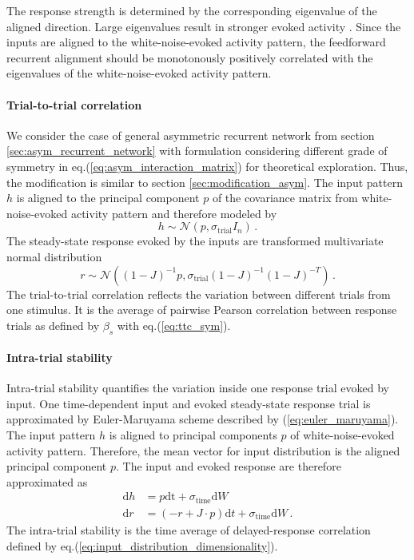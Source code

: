 \documentclass[11pt]{article}
\begin{document}
{	The response strength is determined by the corresponding eigenvalue of the aligned direction. Large eigenvalues result in stronger evoked activity \cite{dayan2005theoretical}. Since the inputs are aligned to the white-noise-evoked activity pattern, the feedforward recurrent alignment should be monotonously positively correlated with the eigenvalues of the white-noise-evoked activity pattern. 
	
	\paragraph{Trial-to-trial correlation} We consider the case of general asymmetric recurrent network from section \ref{sec:asym_recurrent_network} with formulation considering different grade of symmetry in eq.(\ref{eq:asym_interaction_matrix}) for theoretical exploration. Thus, the modification is similar to section \ref{sec:modification_asym}. The input pattern $h$ is aligned to the principal component $p$ of the covariance matrix from white-noise-evoked activity pattern and therefore modeled by
		\begin{equation}
			h \sim \mathcal{N}(p, \sigma_{\text{trial}}I_n) \, .
		\end{equation}
	The steady-state response evoked by the inputs are transformed multivariate normal distribution
		\begin{equation}
			r \sim \mathcal{N}\left((1-J)^{-1}p, \sigma_{\text{trial}} (1-J)^{-1} (1-J)^{-T}\right) \, .
		\end{equation}
	The trial-to-trial correlation reflects the variation between different trials from one stimulus. It is the average of pairwise Pearson correlation between response trials as defined by $\beta_s$ with eq.(\ref{eq:ttc_sym}). 
	
	\paragraph{Intra-trial stability} Intra-trial stability quantifies the variation inside one response trial evoked by input. One time-dependent input and evoked steady-state response trial is approximated by Euler-Maruyama scheme described by (\ref{eq:euler_maruyama}). The input pattern $h$ is aligned to principal components $p$ of white-noise-evoked activity pattern. Therefore, the mean vector for input distribution is the aligned principal component $p$. The input and evoked response are therefore approximated as
		\begin{subequations}
			\begin{align}
				\mathrm{d} h & = p \mathrm{dt} + \sigma_{\text{time}} \mathrm{d} W \\
				\mathrm{d} r & = (-r + J \cdot p) \mathrm{d}t + \sigma_{\text{time}} \mathrm{d} W \, .
			\end{align}
		\end{subequations}
	The intra-trial stability is the time average of delayed-response correlation defined by eq.(\ref{eq:input_distribution_dimensionality}). 
	
}
\end{document}
